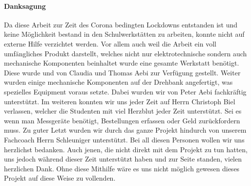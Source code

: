 \paragraph{Danksagung}\mbox{}

Da diese Arbeit zur Zeit des Corona bedingten Lockdowns entstanden ist und keine Möglichkeit bestand in den Schulwerkstätten zu arbeiten, konnte nicht auf externe Hilfe verzichtet werden. Vor allem auch weil die Arbeit ein voll umfängliches Produkt darstellt, welches nicht nur elektrotechnische sondern auch mechanische Komponenten beinhaltet wurde eine gesamte Werkstatt benötigt. Diese wurde und von Claudia und Thomas Aebi zur Verfügung gestellt. Weiter wurden einige mechanische Komponenten auf der Drehbank angefertigt, was spezielles Equipment voraus setzte. Dabei wurden wir von Peter Aebi fachkräftig unterstützt. Im weiteren konnten wir uns jeder Zeit auf Herrn Christoph Biel verlassen, welcher die Studenten mit viel Herzblut jeder Zeit unterstützt. Sei es wenn man Messgeräte benötigt, Bestellungen erfassen oder Geld zurückfordern muss. Zu guter Letzt wurden wir durch das ganze Projekt hindurch von unserem Fachcoach Herrn Schleuniger unterstützt. Bei all diesen Personen wollen wir uns herzlichst bedanken. Auch jenen, die nicht direkt mit dem Projekt zu tun hatten, uns jedoch während dieser Zeit unterstützt haben und zur Seite standen, vielen herzlichen Dank. Ohne diese Mithilfe wäre es uns nicht möglich gewesen dieses Projekt auf diese Weise zu vollenden.

\newpage




